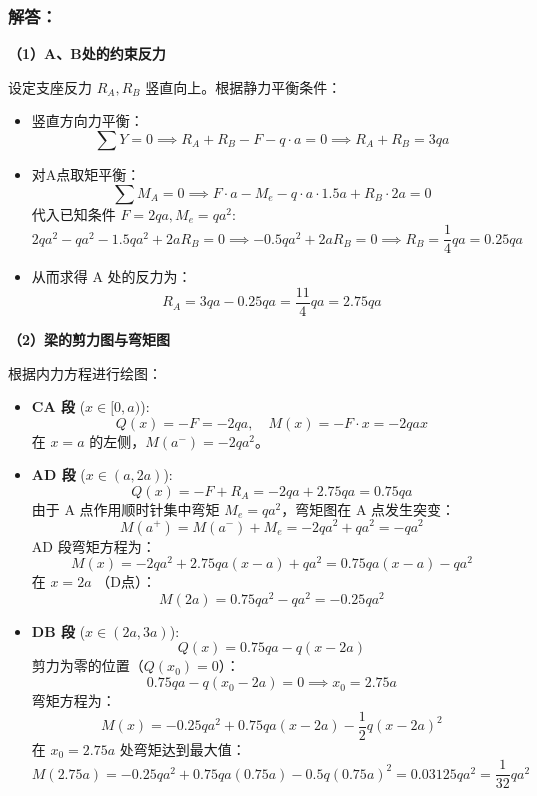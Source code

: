 \documentclass[UTF8,fontset=windows]{ctexart}
\begin{document}
\subsubsection*{解答：}

\textbf{（1）A、B处的约束反力}

设定支座反力 $R_A, R_B$ 竖直向上。根据静力平衡条件：
\begin{itemize}
    \item 竖直方向力平衡：
    \[
        \sum Y = 0 \implies R_A + R_B - F - q \cdot a = 0 \implies R_A + R_B = 3qa
    \]
    \item 对A点取矩平衡：
    \[
        \sum M_A = 0 \implies F \cdot a - M_e - q \cdot a \cdot 1.5a + R_B \cdot 2a = 0
    \]
    代入已知条件 $F = 2qa, M_e = qa^2$:
    \[
        2qa^2 - qa^2 - 1.5qa^2 + 2a R_B = 0 \implies -0.5qa^2 + 2a R_B = 0 \implies R_B = \frac{1}{4}qa = 0.25qa
    \]
    \item 从而求得 A 处的反力为：
    \[
        R_A = 3qa - 0.25qa = \frac{11}{4}qa = 2.75qa
    \]
\end{itemize}

\textbf{（2）梁的剪力图与弯矩图}

根据内力方程进行绘图：
\begin{itemize}
    \item \textbf{CA 段} ($x \in [0, a)$):
    \[
        Q(x) = -F = -2qa, \quad M(x) = -F \cdot x = -2qa x
    \]
    在 $x=a$ 的左侧，$M(a^-) = -2qa^2$。
    \item \textbf{AD 段} ($x \in (a, 2a)$):
    \[
        Q(x) = -F + R_A = -2qa + 2.75qa = 0.75qa
    \]
    由于 A 点作用顺时针集中弯矩 $M_e = qa^2$，弯矩图在 A 点发生突变：
    \[
        M(a^+) = M(a^-) + M_e = -2qa^2 + qa^2 = -qa^2
    \]
    AD 段弯矩方程为：
    \[
        M(x) = -2qa^2 + 2.75qa(x-a) + qa^2 = 0.75qa(x-a) - qa^2
    \]
    在 $x=2a$ （D点）：
    \[
        M(2a) = 0.75qa^2 - qa^2 = -0.25qa^2
    \]
    \item \textbf{DB 段} ($x \in (2a, 3a)$):
    \[
        Q(x) = 0.75qa - q(x-2a)
    \]
    剪力为零的位置（$Q(x_0) = 0$）：
    \[
        0.75qa - q(x_0-2a) = 0 \implies x_0 = 2.75a
    \]
    弯矩方程为：
    \[
        M(x) = -0.25qa^2 + 0.75qa(x-2a) - \frac{1}{2}q(x-2a)^2
    \]
    在 $x_0 = 2.75a$ 处弯矩达到最大值：
    \[
        M(2.75a) = -0.25qa^2 + 0.75qa(0.75a) - 0.5q(0.75a)^2 = 0.03125 qa^2 = \frac{1}{32}qa^2
    \]
\end{itemize}

\begin{center}
\end{center}
\end{document}

